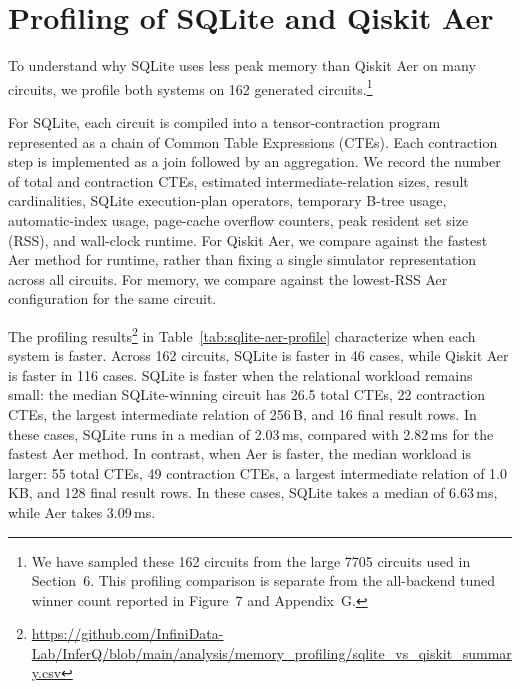 \section{Profiling of SQLite and Qiskit Aer}
\label{sec:deep-profile-sqlite-aer}

To understand why SQLite uses less peak memory than Qiskit Aer on many circuits,
we profile both systems on 162 generated circuits.\footnote{We have sampled these 162 circuits
  from the large \num{7705} circuits used in Section~6. This profiling comparison is separate from the all-backend tuned
winner count reported in Figure~7 and Appendix~G.}

For SQLite, each circuit is compiled into a tensor-contraction program represented
as a chain of Common Table Expressions (CTEs). Each contraction step is implemented
as a join followed by an aggregation. We record the number of total and contraction
CTEs, estimated intermediate-relation sizes, result cardinalities, SQLite
execution-plan operators, temporary B-tree usage, automatic-index usage,
page-cache overflow counters, peak resident set size (RSS), and wall-clock
runtime. For Qiskit Aer, we compare against the fastest   Aer method for
runtime, rather than fixing a single simulator representation across all circuits.
For memory, we compare against the lowest-RSS   Aer configuration for
the same circuit.

The profiling results\footnote{\url{https://github.com/InfiniData-Lab/InferQ/blob/main/analysis/memory_profiling/sqlite_vs_qiskit_summary.csv}} in Table~\ref{tab:sqlite-aer-profile} characterize when
each system is faster. Across 162 circuits, SQLite is faster in 46 cases, while
Qiskit Aer is faster in 116 cases. SQLite is faster when the relational workload
remains small: the median SQLite-winning circuit has 26.5 total CTEs, 22
contraction CTEs, the largest intermediate relation of 256\,B, and 16 final result
rows. In these cases, SQLite runs in a median of 2.03\,ms, compared with
2.82\,ms for the fastest   Aer method. In contrast, when Aer is faster,
the median workload is larger: 55 total CTEs, 49 contraction CTEs, a largest
intermediate relation of 1.0\,KB, and 128 final result rows. In these cases,
SQLite takes a median of 6.63\,ms, while Aer takes 3.09\,ms.

